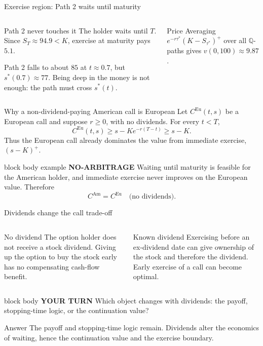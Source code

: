\documentclass[handout,10pt,aspectratio=169]{beamer}
\newenvironment{marketbox}{\begin{beamercolorbox}[rounded=true,sep=0.7em,wd=\textwidth]{block body example}
  \textbf{\color{CourseGreen}NO-ARBITRAGE}\quad}{\end{beamercolorbox}}
\newenvironment{pausebox}{\begin{beamercolorbox}[rounded=true,sep=0.8em,wd=\textwidth]{block body}
  \textbf{\color{CourseGold}YOUR TURN}\quad}{\end{beamercolorbox}}
\newcommand{\Q}{\mathbb Q}
\begin{document}
\begin{frame}{Exercise region: Path 2 waits until maturity}
\begin{columns}[T,onlytextwidth]
%
\begin{block}{Path 2 never touches it}
The holder waits until \(T\). Since \(S_T\approx94.9<K\), exercise at
maturity pays \(5.1\).
\smallskip

Path 2 falls to about \(85\) at \(t\approx0.7\), but \(s^*(0.7)\approx77\).
Being deep in the money is not enough: the path must cross \(s^*(t)\).
\end{block}
\begin{exampleblock}{Price}
Averaging \(e^{-r\tau^*}(K-S_{\tau^*})^+\) over all \(\Q\)-paths gives \(v(0,100)\approx9.87\).
\end{exampleblock}
\end{columns}
\end{frame}

\begin{frame}{Why a non-dividend-paying American call is European}
Let \(C^{\mathrm{Eu}}(t,s)\) be a European call and suppose \(r\geq0\), with
no dividends. For every \(t<T\),
\[
C^{\mathrm{Eu}}(t,s)\geq s-Ke^{-r(T-t)}\geq s-K.
\]
Thus the European call already dominates the value from immediate exercise,
\((s-K)^+\).
\begin{marketbox}
Waiting until maturity is feasible for the American holder, and immediate
exercise never improves on the European value. Therefore
\[
\boxed{C^{\mathrm{Am}}=C^{\mathrm{Eu}}\quad\text{(no dividends).}}
\]
\end{marketbox}
\end{frame}

\begin{frame}{Dividends change the call trade-off}
\begin{columns}[T,onlytextwidth]
\begin{block}{No dividend}
The option holder does not receive a stock dividend. Giving up the option to
buy the stock early has no compensating cash-flow benefit.
\end{block}
\begin{exampleblock}{Known dividend}
Exercising before an ex-dividend date can give ownership of the stock and
therefore the dividend. Early exercise of a call can become optimal.
\end{exampleblock}
\end{columns}
\begin{pausebox}
Which object changes with dividends: the payoff, stopping-time logic, or
the continuation value?
\end{pausebox}

\begin{exampleblock}{Answer}
The payoff and stopping-time logic remain. Dividends alter the economics of
waiting, hence the continuation value and the exercise boundary.
\end{exampleblock}
\end{frame}
\end{document}
